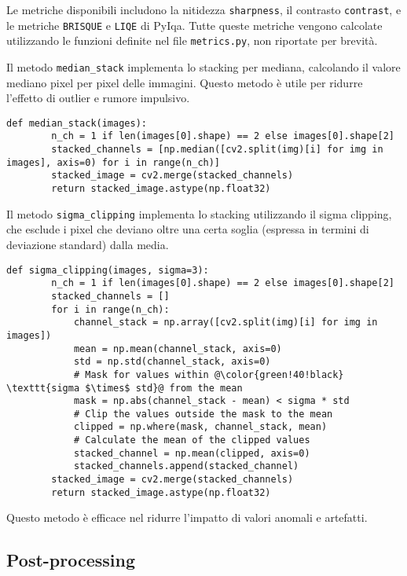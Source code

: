 Le metriche disponibili includono la nitidezza \texttt{sharpness}, il contrasto \texttt{contrast}, e le metriche \texttt{BRISQUE} e \texttt{LIQE} di PyIqa. Tutte queste metriche vengono calcolate utilizzando le funzioni definite nel file \texttt{metrics.py}, non riportate per brevità.

Il metodo \texttt{median\_stack} implementa lo stacking per mediana, calcolando il valore mediano pixel per pixel delle immagini. Questo metodo è utile per ridurre l'effetto di outlier e rumore impulsivo.

\begin{lstlisting}[label={lst:median_stack}]
    def median_stack(images):
        n_ch = 1 if len(images[0].shape) == 2 else images[0].shape[2]
        stacked_channels = [np.median([cv2.split(img)[i] for img in images], axis=0) for i in range(n_ch)]
        stacked_image = cv2.merge(stacked_channels)
        return stacked_image.astype(np.float32)
\end{lstlisting}

Il metodo \texttt{sigma\_clipping} implementa lo stacking utilizzando il sigma clipping, che esclude i pixel che deviano oltre una certa soglia (espressa in termini di deviazione standard) dalla media.

\begin{lstlisting}[label={lst:sigma_clipping}]
    def sigma_clipping(images, sigma=3):
        n_ch = 1 if len(images[0].shape) == 2 else images[0].shape[2]
        stacked_channels = []
        for i in range(n_ch):
            channel_stack = np.array([cv2.split(img)[i] for img in images])
            mean = np.mean(channel_stack, axis=0)
            std = np.std(channel_stack, axis=0)
            # Mask for values within @\color{green!40!black} \texttt{sigma $\times$ std}@ from the mean
            mask = np.abs(channel_stack - mean) < sigma * std
            # Clip the values outside the mask to the mean
            clipped = np.where(mask, channel_stack, mean)
            # Calculate the mean of the clipped values
            stacked_channel = np.mean(clipped, axis=0)
            stacked_channels.append(stacked_channel)
        stacked_image = cv2.merge(stacked_channels)
        return stacked_image.astype(np.float32)
\end{lstlisting}

Questo metodo è efficace nel ridurre l'impatto di valori anomali e artefatti.

\subsection{Post-processing} \label{subsec:postprocessing_impl}

